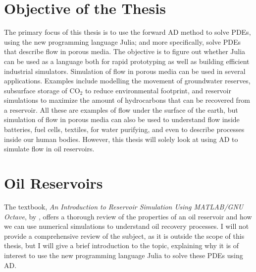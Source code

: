 \section{Objective of the Thesis}
The primary focus of this thesis is to use the forward AD method to solve PDEs, using the new programming language Julia; and more specifically, solve PDEs that describe flow in porous media. The objective is to figure out whether Julia can be used as a language both for rapid prototyping as well as building efficient industrial simulators. Simulation of flow in porous media can be used in several applications. Examples include modelling the movement of groundwater reserves, subsurface storage of CO$_2$ to reduce environmental footprint, and reservoir simulations to maximize the amount of hydrocarbons that can be recovered from a reservoir. All these are examples of flow under the surface of the earth, but simulation of flow in porous media can also be used to understand flow inside batteries, fuel cells, textiles, for water purifying, and even to describe processes inside our human bodies. However, this thesis will solely look at using AD to simulate flow in oil reservoirs.

\section{Oil Reservoirs}
\label{sec:OilReservoirs}
The textbook, \textit{An Introduction to Reservoir Simulation Using MATLAB/GNU Octave}, by \emph{\citet{lieMrstUrl}}, offers a thorough review of the properties of an oil reservoir and how we can use numerical simulations to understand oil recovery processes. I will not provide a comprehensive review of the subject, as it is outside the scope of this thesis, but I will give a brief introduction to the topic, explaining why it is of interest to use the new programming language Julia to solve these PDEs using AD.

